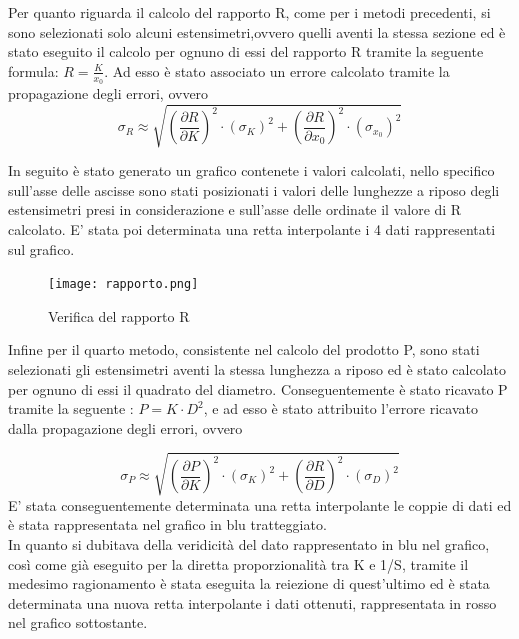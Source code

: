 \documentclass[a4paper,11pt,oneside]{article}
\begin{document}
Per quanto riguarda il calcolo del rapporto R, come per i metodi precedenti, si sono selezionati solo alcuni estensimetri,ovvero quelli aventi la stessa sezione ed è stato eseguito il calcolo per ognuno di essi del rapporto R tramite la seguente formula: $R=\frac{K}{x_{0}}$. Ad esso è stato associato un errore calcolato tramite la propagazione degli errori, ovvero 
\begin{equation*}
    \sigma_R \approx \sqrt{\left ( \frac{\partial R }{\partial K} \right )^2 \cdot \left ( \sigma_K \right )^2 + \left ( \frac{\partial R }{\partial x_0} \right )^2 \cdot \left ( \sigma_{x_0} \right )^2 }
\end{equation*}

In seguito è stato generato un grafico contenete i valori calcolati, nello specifico sull'asse delle ascisse sono stati posizionati i valori delle lunghezze a riposo degli estensimetri presi in considerazione e sull'asse delle ordinate il valore di R calcolato. E' stata poi determinata una retta interpolante i 4 dati rappresentati sul grafico.


\begin{figure}[h!]
    \centering

        \label{fig:a_lunghezza_cost}
        \texttt{[image: rapporto.png]}
        \caption{Verifica del rapporto R}
\end{figure}
Infine per il quarto metodo, consistente nel calcolo del prodotto P, sono stati selezionati gli estensimetri aventi la stessa lunghezza a riposo ed è stato calcolato per ognuno di essi il quadrato del diametro. Conseguentemente è stato ricavato P tramite la seguente : $P= K \cdot D^2 $, e ad esso è stato attribuito l'errore  ricavato dalla propagazione degli errori, ovvero 

\begin{equation*}
    \sigma_P \approx \sqrt{\left ( \frac{\partial P }{\partial K} \right )^2 \cdot \left ( \sigma_K \right )^2 + \left ( \frac{\partial R }{\partial D} \right )^2 \cdot \left ( \sigma_D \right )^2 }
\end{equation*}
E' stata conseguentemente determinata una retta interpolante le coppie di dati ed è stata rappresentata nel grafico in blu tratteggiato.\\
In quanto si dubitava della veridicità del dato rappresentato in blu nel grafico, così come già eseguito per la diretta proporzionalità tra K e 1/S, tramite il medesimo ragionamento è stata eseguita la reiezione di quest'ultimo ed è stata determinata una nuova retta interpolante i dati ottenuti, rappresentata in rosso nel grafico sottostante.
\end{document}
